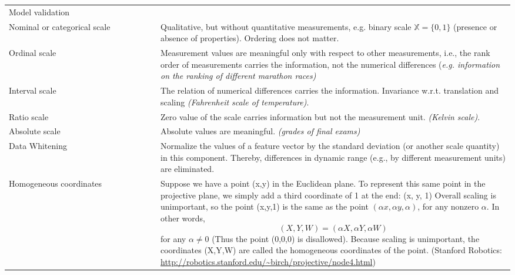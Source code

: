\documentclass[MachineLearning]{subfiles}
\begin{document}
\begin{longtable}{p{0.3\linewidth} p{0.7\linewidth}}
Model validation & \\
Nominal or categorical scale & Qualitative, but without quantitative measurements,
e.g. binary scale \(\mathbb{X} = \{0, 1\}\) (presence or absence of
properties). Ordering does not matter.\\
Ordinal scale & Measurement values are meaningful only with respect to other measurements, i.e., the rank order of measurements carries
the information, not the numerical differences {\color{orange}(\emph{e.g. information on the ranking of different marathon races)}}\\
Interval scale &  The relation of numerical differences carries
the information. Invariance w.r.t. translation and scaling {\color{orange}\emph{(Fahrenheit scale of temperature)}}.\\
Ratio scale & Zero value of the scale carries information but not the measurement unit. {\color{orange}\emph{(Kelvin scale)}}.\\
Absolute scale & Absolute values are meaningful. {\color{orange}\emph{(grades of final exams)}}\\
Data Whitening & Normalize the values of a feature vector by the standard deviation (or another scale quantity) in this component. Thereby, differences in dynamic range (e.g., by different measurement units) are eliminated.\\
Homogeneous coordinates \label{homogeneous-coordinates@Glossary} & Suppose we have a point (x,y) in the Euclidean plane. To represent this same point in the projective plane, we simply add a third coordinate of 1 at the end: (x, y, 1) Overall scaling is unimportant, so the point (x,y,1) is the same as the point  \((\alpha x, \alpha y, \alpha)\), for any nonzero \(\alpha\). In other words, 
\[(X,Y,W) = (\alpha X, \alpha Y, \alpha W)\]
for any  $\alpha \neq 0$ (Thus the point (0,0,0) is disallowed). Because scaling is unimportant, the coordinates (X,Y,W) are called the homogeneous coordinates of the point. (Stanford Robotics: \url{http://robotics.stanford.edu/~birch/projective/node4.html})\\


\end{longtable}
\end{document}
